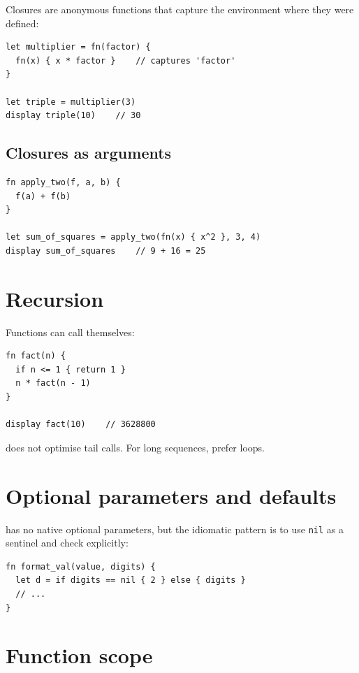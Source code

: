 Closures are anonymous functions that capture the environment where they
were defined:

\begin{lstlisting}[caption={Basic closure}]
let multiplier = fn(factor) {
  fn(x) { x * factor }    // captures 'factor'
}

let triple = multiplier(3)
display triple(10)    // 30
\end{lstlisting}

\subsection*{Closures as arguments}

\begin{lstlisting}
fn apply_two(f, a, b) {
  f(a) + f(b)
}

let sum_of_squares = apply_two(fn(x) { x^2 }, 3, 4)
display sum_of_squares    // 9 + 16 = 25
\end{lstlisting}

\section{Recursion}

Functions can call themselves:

\begin{lstlisting}[caption={Recursive factorial}]
fn fact(n) {
  if n <= 1 { return 1 }
  n * fact(n - 1)
}

display fact(10)    // 3628800
\end{lstlisting}

\begin{nota}
  \hayashi{} does not optimise tail calls. For long sequences, prefer
  loops.
\end{nota}

\section{Optional parameters and defaults}

\hayashi{} has no native optional parameters, but the idiomatic pattern is
to use \lstinline{nil} as a sentinel and check explicitly:

\begin{lstlisting}
fn format_val(value, digits) {
  let d = if digits == nil { 2 } else { digits }
  // ...
}
\end{lstlisting}

\section{Function scope}

